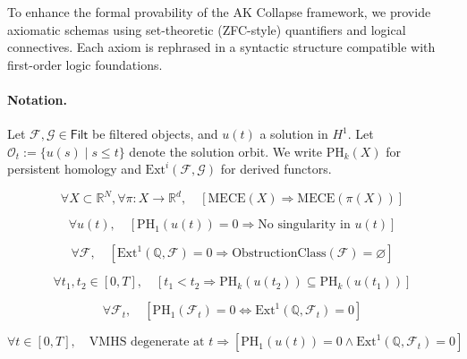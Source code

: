 \documentclass[11pt]{article}
\theoremstyle{definition}
\begin{document}
To enhance the formal provability of the AK Collapse framework, we provide axiomatic schemas using set-theoretic (ZFC-style) quantifiers and logical connectives.  
Each axiom is rephrased in a syntactic structure compatible with first-order logic foundations.

\paragraph{Notation.}  
Let $\mathcal{F}, \mathcal{G} \in \mathsf{Filt}$ be filtered objects, and $u(t)$ a solution in $H^1$.  
Let $\mathcal{O}_t := \{ u(s) \mid s \leq t \}$ denote the solution orbit.  
We write $\mathrm{PH}_k(X)$ for persistent homology and $\mathrm{Ext}^i(\mathcal{F}, \mathcal{G})$ for derived functors.

\begin{axiom}
\[
\forall X \subset \mathbb{R}^N, \forall \pi: X \to \mathbb{R}^d, \quad \left[
\text{MECE}(X) \Rightarrow \text{MECE}(\pi(X))
\right]
\]
\end{axiom}

\begin{axiom}
\[
\forall u(t), \quad \left[
\mathrm{PH}_1(u(t)) = 0 \Rightarrow \text{No singularity in } u(t)
\right]
\]
\end{axiom}

\begin{axiom}
\[
\forall \mathcal{F}, \quad \left[
\mathrm{Ext}^1(\mathbb{Q}, \mathcal{F}) = 0 \Rightarrow \text{ObstructionClass}(\mathcal{F}) = \varnothing
\right]
\]
\end{axiom}

\begin{axiom}
\[
\forall t_1, t_2 \in [0,T], \quad \left[
t_1 < t_2 \Rightarrow \mathrm{PH}_k(u(t_2)) \subseteq \mathrm{PH}_k(u(t_1))
\right]
\]
\end{axiom}

\begin{axiom}
\[
\forall \mathcal{F}_t, \quad \left[
\mathrm{PH}_1(\mathcal{F}_t) = 0 \Leftrightarrow \mathrm{Ext}^1(\mathbb{Q}, \mathcal{F}_t) = 0
\right]
\]
\end{axiom}

\begin{axiom}
\[
\forall t \in [0,T], \quad \text{VMHS degenerate at } t \Rightarrow \left[
\mathrm{PH}_1(u(t)) = 0 \wedge \mathrm{Ext}^1(\mathbb{Q}, \mathcal{F}_t) = 0
\right]
\]
\end{axiom}
\end{document}
